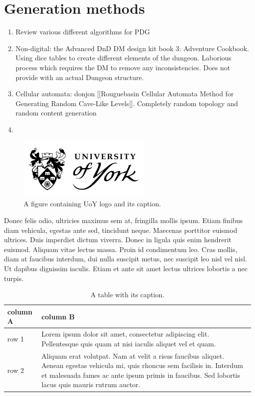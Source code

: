 \documentclass{UoYCSproject}
\begin{document}
\section{Generation methods}
\begin{enumerate}
  \item Review various different algorithms for PDG
    \item Non-digital: the Advanced DnD DM design kit book 3: Adventure Cookbook. Using dice tables to create different elements of the dungeon. Laborious process which requires the DM to remove any inconsistencies. Does not provide with an actual Dungeon structure.
    \item Cellular automata: donjon [[Rouguebasin Cellular Automata Method for Generating Random Cave-Like Levels]]. Completely random topology and random content generation
    \item 
\end{enumerate}




\begin{figure}[htb]
\begin{center}
\includegraphics[height=3cm]{"./UOY-Logo-Stacked-shield-Black.png"}
\end{center}
\caption{A figure containing UoY logo and its caption.}
\end{figure}

Donec felis odio, ultricies maximus sem at, fringilla mollis ipsum. Etiam finibus diam vehicula, egestas ante sed, tincidunt neque. Maecenas porttitor euismod ultrices. Duis imperdiet dictum viverra. Donec in ligula quis enim hendrerit euismod. Aliquam vitae lectus massa. Proin id condimentum leo. Cras mollis, diam at faucibus interdum, dui nulla suscipit metus, nec suscipit leo nisl vel nisl. Ut dapibus dignissim iaculis. Etiam et ante sit amet lectus ultrices lobortis a nec turpis.

\begin{table}[htb]
\caption{ A table with its caption.}
\begin{center}
\begin{tabular}{|p{}|p{}|}
\hline
column A & column B \\\hline
row 1 &
Lorem ipsum dolor sit amet, consectetur adipiscing elit. Pellentesque quis quam at nisi iaculis aliquet vel et quam. \\\hline
row 2 &
Aliquam erat volutpat. Nam at velit a risus faucibus aliquet. Aenean egestas vehicula mi, quis rhoncus sem facilisis in. Interdum et malesuada fames ac ante ipsum primis in faucibus. Sed lobortis lacus quis mauris rutrum auctor. \\\hline
\end{tabular}
\end{center}
\end{table}
\end{document}
